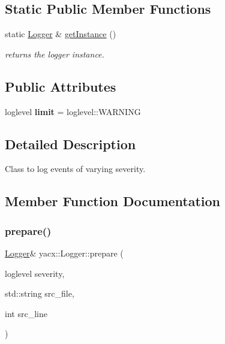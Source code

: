 \subsection*{Static Public Member Functions}
\begin{DoxyCompactItemize}
\item 
\mbox{\label{classyacx_1_1_logger_a021052d3d6ff65d9a20364e8bc174a0d}} 
static \hyperlink{classyacx_1_1_logger}{Logger} \& \hyperlink{classyacx_1_1_logger_a021052d3d6ff65d9a20364e8bc174a0d}{get\+Instance} ()
\begin{DoxyCompactList}\small\item\em returns the logger instance. \end{DoxyCompactList}\end{DoxyCompactItemize}
\subsection*{Public Attributes}
\begin{DoxyCompactItemize}
\item 
\mbox{\label{classyacx_1_1_logger_a14442f8e8d10038337e0cbab670e751b}} 
loglevel {\bfseries limit} = loglevel\+::\+W\+A\+R\+N\+I\+NG
\end{DoxyCompactItemize}


\subsection{Detailed Description}
Class to log events of varying severity. 

\subsection{Member Function Documentation}
\mbox{\label{classyacx_1_1_logger_ac659e0b4e6d1777bc2538c03d17b5791}} 
\subsubsection{\texorpdfstring{prepare()}{prepare()}}
{\footnotesize\ttfamily \hyperlink{classyacx_1_1_logger}{Logger}\& yacx\+::\+Logger\+::prepare (\begin{DoxyParamCaption}\item[{loglevel}]{severity,  }\item[{std\+::string}]{src\+\_\+file,  }\item[{int}]{src\+\_\+line }\end{DoxyParamCaption})\hspace{0.3cm}{\ttfamily [inline]}}

